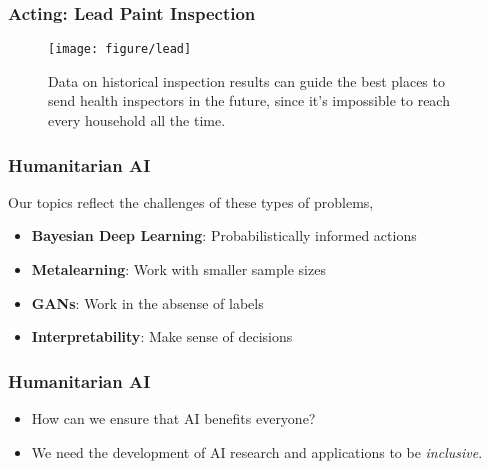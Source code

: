 \documentclass[10pt,mathserif]{beamer}
\begin{document}
\begin{frame}
  \frametitle{Acting: Lead Paint Inspection}
  \begin{figure}[ht]
    \centering
    \texttt{[image: figure/lead]}
    \caption{Data on historical inspection results can guide the best places to
      send health inspectors in the future, since it's impossible to reach every
      household all the time.
      \label{fig:lead_paint} }
  \end{figure}
\end{frame}

\begin{frame}
  \frametitle{Humanitarian AI}
  Our topics reflect the challenges of these types of problems,
  \begin{itemize}
  \item \textbf{Bayesian Deep Learning}: Probabilistically informed actions
  \item \textbf{Metalearning}: Work with smaller sample sizes
  \item \textbf{GANs}: Work in the absense of labels
  \item \textbf{Interpretability}: Make sense of decisions
  \end{itemize}
\end{frame}

\begin{frame}
  \frametitle{Humanitarian AI}
  \begin{itemize}
  \item How can we ensure that AI benefits everyone?
  \item We need the development of AI research and applications to be
    \textit{inclusive}.
  \end{itemize}
\end{frame}
\end{document}
